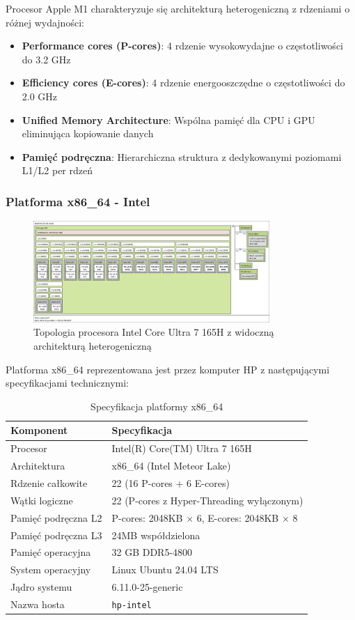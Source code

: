 Procesor Apple M1 charakteryzuje się architekturą heterogeniczną  z rdzeniami o różnej wydajności:
\begin{itemize}
    \item \textbf{Performance cores (P-cores)}: 4 rdzenie wysokowydajne o częstotliwości do 3.2 GHz
    \item \textbf{Efficiency cores (E-cores)}: 4 rdzenie energooszczędne o częstotliwości do 2.0 GHz
    \item \textbf{Unified Memory Architecture}: Wspólna pamięć dla CPU i GPU eliminująca kopiowanie danych
    \item \textbf{Pamięć podręczna}: Hierarchiczna struktura z dedykowanymi poziomami L1/L2 per rdzeń
\end{itemize}

\subsubsection{Platforma x86\_64 - Intel}
\begin{figure}[H]
\centering
\includegraphics[width=0.8\textwidth]{images/x86.png}
\caption{Topologia procesora Intel Core Ultra 7 165H z widoczną architekturą heterogeniczną}
\label{fig:intel_topology}
\end{figure}
Platforma x86\_64 reprezentowana jest przez komputer HP z następującymi specyfikacjami technicznymi:

\begin{table}[h]
\centering
\caption{Specyfikacja platformy x86\_64}
\begin{tabular}{|l|l|}
\hline
\textbf{Komponent} & \textbf{Specyfikacja} \\
\hline
Procesor & Intel(R) Core(TM) Ultra 7 165H \\
Architektura & x86\_64 (Intel Meteor Lake) \\
Rdzenie całkowite & 22 (16 P-cores + 6 E-cores) \\
Wątki logiczne & 22 (P-cores z Hyper-Threading wyłączonym) \\
Pamięć podręczna L2 & P-cores: 2048KB $\times$ 6, E-cores: 2048KB $\times$ 8 \\
Pamięć podręczna L3 & 24MB współdzielona \\
Pamięć operacyjna & 32 GB DDR5-4800 \\
System operacyjny & Linux Ubuntu 24.04 LTS \\
Jądro systemu & 6.11.0-25-generic \\
Nazwa hosta & \texttt{hp-intel} \\
\hline
\end{tabular}

\label{tab:x86_specs}
\end{table}


